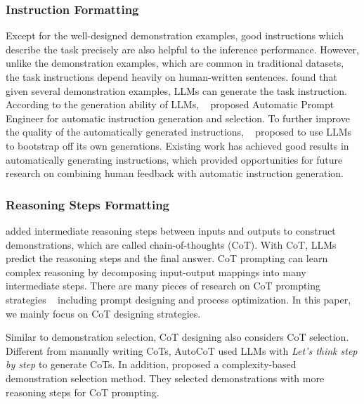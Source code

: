 \subsubsection{Instruction Formatting}
\label{sec:formatting_instruction}
Except for the well-designed demonstration examples, good instructions which describe the task precisely are also helpful to the inference performance.
However, unlike the demonstration examples, which are common in traditional datasets, the task instructions depend heavily on human-written sentences.
\citet{induct} found that given several demonstration examples, LLMs can generate the task instruction.
According to the generation ability of LLMs, ~\citet{zhou2022large} proposed Automatic Prompt Engineer for automatic instruction generation and selection.
To further improve the quality of the automatically generated instructions, ~\citet{wang2022self} proposed to use LLMs to bootstrap off its own generations.
Existing work has achieved good results in automatically generating instructions, which provided opportunities for future research on combining human feedback with automatic instruction generation.





\subsubsection{Reasoning Steps Formatting}
\label{sec:formatting_intermediate}



\citet{cot} added intermediate reasoning steps between inputs and outputs to construct demonstrations, which are called chain-of-thoughts (CoT). With CoT, LLMs predict the reasoning steps and the final answer. CoT prompting can learn complex reasoning by decomposing input-output mappings into many intermediate steps. There are many pieces of research on CoT prompting strategies ~\citep{qiao2022reasoning} including prompt designing and process optimization. In this paper, we mainly focus on CoT designing strategies.

Similar to demonstration selection, CoT designing also considers CoT selection. Different from \citet{cot} manually writing CoTs, AutoCoT \citep{autocot} used LLMs with \textit{Let's think step by step} to generate CoTs. In addition, \citet{fu2022complexitycot} proposed a complexity-based demonstration selection method. They selected demonstrations with more reasoning steps for CoT prompting. 

